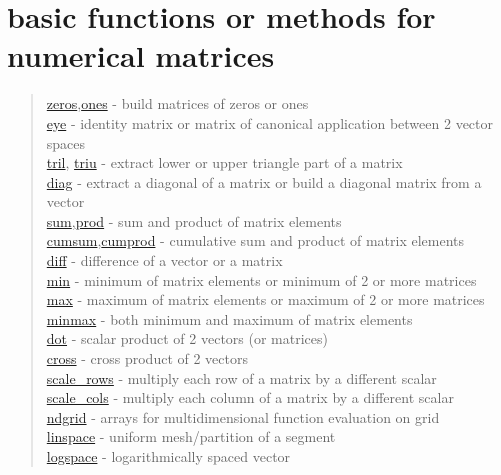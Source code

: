 \chapter*{basic functions or methods for numerical matrices}

\begin{quote}
\noindent
\hyperlink{zeros}{zeros},\hyperlink{ones}{ones} - build matrices of zeros or ones \\
\hyperlink{eye}{eye} - identity matrix or matrix of canonical application between 2 vector spaces \\
\hyperlink{tril}{tril}, \hyperlink{triu}{triu} - extract lower or upper triangle part of a matrix \\
\hyperlink{diag}{diag} - extract a diagonal of a matrix or build a diagonal matrix from a vector \\
\hyperlink{sum}{sum},\hyperlink{prod}{prod} - sum and product of matrix elements \\
\hyperlink{cumsum}{cumsum},\hyperlink{cumprod}{cumprod} - cumulative sum and product of matrix elements \\
\hyperlink{diff}{diff} - difference of a vector or a matrix \\
\hyperlink{min}{min} - minimum of matrix elements or minimum of 2 or more matrices \\
\hyperlink{max}{max} - maximum of matrix elements or maximum of 2 or more matrices \\
\hyperlink{minmax}{minmax} - both minimum and maximum of matrix elements\\
\hyperlink{dot}{dot} - scalar product of 2 vectors (or matrices) \\
\hyperlink{cross}{cross} - cross product of 2 vectors \\
\hyperlink{scale_rows}{scale\_rows} - multiply each row of a matrix by a different scalar \\
\hyperlink{scale_cols}{scale\_cols} - multiply each column of a matrix by a different scalar \\
\hyperlink{ndgrid}{ndgrid} - arrays for multidimensional function evaluation on grid \\
\hyperlink{linspace}{linspace} - uniform mesh/partition of a segment \\
\hyperlink{logspace}{logspace} - logarithmically spaced vector \\
\end{quote}
 
 
  
  
  
 
 
 
 
 
 

  
  
  



